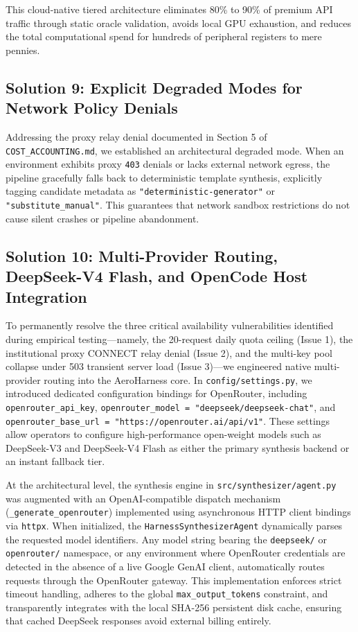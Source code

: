 \documentclass[11pt,a4paper]{article}
\begin{document}
This cloud-native tiered architecture eliminates 80\% to 90\% of premium API traffic through static oracle validation, avoids local GPU exhaustion, and reduces the total computational spend for hundreds of peripheral registers to mere pennies.

\subsection{Solution 9: Explicit Degraded Modes for Network Policy Denials}
Addressing the proxy relay denial documented in Section 5 of \texttt{COST\_ACCOUNTING.md}, we established an architectural degraded mode. When an environment exhibits proxy \texttt{403} denials or lacks external network egress, the pipeline gracefully falls back to deterministic template synthesis, explicitly tagging candidate metadata as \texttt{"deterministic-generator"} or \texttt{"substitute\_manual"}. This guarantees that network sandbox restrictions do not cause silent crashes or pipeline abandonment.

\subsection{Solution 10: Multi-Provider Routing, DeepSeek-V4 Flash, and OpenCode Host Integration}
To permanently resolve the three critical availability vulnerabilities identified during empirical testing---namely, the 20-request daily quota ceiling (Issue 1), the institutional proxy CONNECT relay denial (Issue 2), and the multi-key pool collapse under 503 transient server load (Issue 3)---we engineered native multi-provider routing into the AeroHarness core. In \texttt{config/settings.py}, we introduced dedicated configuration bindings for OpenRouter, including \texttt{openrouter\_api\_key}, \texttt{openrouter\_model = "deepseek/deepseek-chat"}, and \texttt{openrouter\_base\_url = "https://openrouter.ai/api/v1"}. These settings allow operators to configure high-performance open-weight models such as DeepSeek-V3 and DeepSeek-V4 Flash as either the primary synthesis backend or an instant fallback tier.

At the architectural level, the synthesis engine in \texttt{src/synthesizer/agent.py} was augmented with an OpenAI-compatible dispatch mechanism (\texttt{\_generate\_openrouter}) implemented using asynchronous HTTP client bindings via \texttt{httpx}. When initialized, the \texttt{HarnessSynthesizerAgent} dynamically parses the requested model identifiers. Any model string bearing the \texttt{deepseek/} or \texttt{openrouter/} namespace, or any environment where OpenRouter credentials are detected in the absence of a live Google GenAI client, automatically routes requests through the OpenRouter gateway. This implementation enforces strict timeout handling, adheres to the global \texttt{max\_output\_tokens} constraint, and transparently integrates with the local SHA-256 persistent disk cache, ensuring that cached DeepSeek responses avoid external billing entirely.
\end{document}

